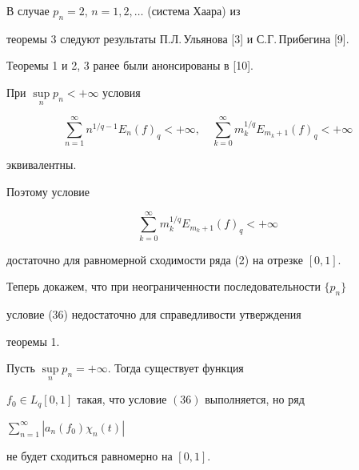  


\begin{note} 


В случае $p_n=2$, $n=1,2,\dotsc$ (система Хаара) из 


теоремы 3 следуют результаты П.Л.\,Ульянова [3] и С.Г.\,Прибегина [9]. 


Теоремы 1 и 2, 3 ранее были анонсированы в [10]. 


\end{note} 


 


\begin{note} 


При $\sup\limits_n p_n<+\infty$ условия 


$$ 


\sum^\infty_{n=1}n^{1/q-1}E_n(f)_q<+\infty,\quad 


\sum^\infty_{k=0}m^{1/q}_k E_{m_k+1}(f)_q<+\infty 


$$ 


эквивалентны. 


 


Поэтому условие 


\begin{equation} 


\sum^\infty_{k=0}m^{1/q}_k E_{m_k+1}(f)_q<+\infty 


\end{equation} 


достаточно для равномерной сходимости ряда (2) на отрезке $[0,1]$. 


\end{note} 


 


Теперь докажем, что при неограниченности последовательности $\{p_n\}$ 


условие (36) недостаточно для справедливости утверждения 


теоремы 1. 


 


\begin{thm} 


Пусть $\sup\limits_n p_n=+\infty$. Тогда существует функция 


$f_0\in L_q[0,1]$ такая, что условие $(36)$ выполняется, но ряд 


$\sum\limits^\infty_{n=1}|a_n(f_0)\chi_n(t)|$ 


не будет сходиться равномерно на $[0,1]$. 


\end{thm} 


